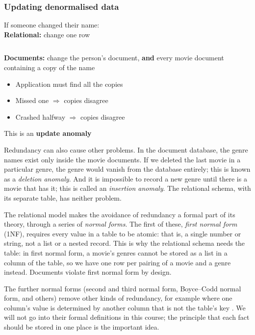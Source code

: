\begin{frame}
    \label{s:update-anomaly}
    \frametitle{Updating denormalised data}
    If someone changed their name:\\[0.8em]
    \textbf{Relational:} change one row
    \inputminted[fontsize=\footnotesize]{sql}{code/rename-relational.sql}
    \vspace{0.8em}\pause
    \textbf{Documents:} change the person's document, \textbf{and} every movie document containing a copy of the name
    \begin{itemize}
        \item Application must find all the copies
        \item Missed one $\Rightarrow$ copies disagree
        \item Crashed halfway $\Rightarrow$ copies disagree\\[0.8em]
    \end{itemize}
    This is an \textbf{update anomaly}
\end{frame}
\label{l:update-anomaly}

Redundancy can also cause other problems.
In the document database, the genre names exist only inside the movie documents.
If we deleted the last movie in a particular genre, the genre would vanish from the database entirely; this is known as a \emph{deletion anomaly}.
And it is impossible to record a new genre until there is a movie that has it; this is called an \emph{insertion anomaly}.
The relational schema, with its separate  table, has neither problem.

The relational model makes the avoidance of redundancy a formal part of its theory, through a series of \emph{normal forms}.
The first of these, \emph{first normal form} (1NF), requires every value in a table to be atomic: that is, a single number or string, not a list or a nested record.
This is why the relational schema needs the  table: in first normal form, a movie's genres cannot be stored as a list in a column of the  table, so we have one row per pairing of a movie and a genre instead.
Documents violate first normal form by design.

The further normal forms (second and third normal form, Boyce--Codd normal form, and others) remove other kinds of redundancy, for example where one column's value is determined by another column that is not the table's key \citep{Kent1983}.
We will not go into their formal definitions in this course; the principle that each fact should be stored in one place is the important idea.


